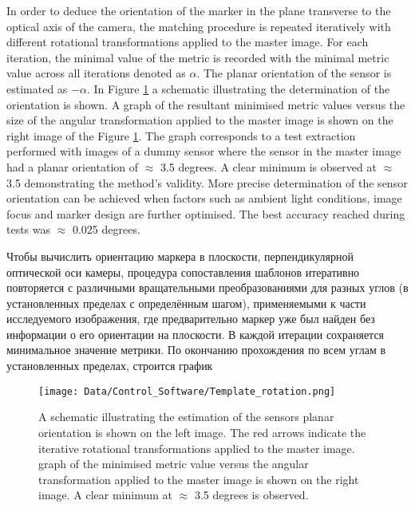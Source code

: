 In order to deduce the orientation of the marker in the plane transverse to the optical axis of the camera, the matching procedure is repeated iteratively with different rotational transformations applied to the master image. For each iteration, the minimal value of the metric is recorded with the minimal metric value across all iterations denoted as $\alpha$. The planar orientation of the sensor is estimated as $-\alpha$. In Figure \ref{fig:template_rotation} a schematic illustrating the determination of the orientation is shown. A graph of the resultant minimised metric values versus the size of the angular transformation applied to the master image is shown on the right image of the Figure \ref{fig:template_rotation}. The graph corresponds to a test extraction performed with images of a dummy sensor where the sensor in the master image had a planar orientation of $\approx$ 3.5 degrees. A clear minimum is observed at $\approx$ 3.5 demonstrating the method's validity. More precise determination of the sensor orientation can be achieved when factors such as ambient light conditions, image focus and marker design are further optimised. The best accuracy reached during tests was $\approx$ 0.025 degrees.

Чтобы вычислить ориентацию маркера в плоскости, перпендикулярной оптической оси камеры, процедура сопоставления шаблонов итеративно повторяется с различными вращательными преобразованиями для разных углов (в установленных пределах с определённым шагом), применяемыми к части исследуемого изображения, где предварительно маркер уже был найден без информации о его ориентации на плоскости. В каждой итерации сохраняется минимальное значение метрики. По окончанию прохождения по всем углам в установленных пределах, строится график 

\begin{figure}[ht]\centering
\texttt{[image: Data/Control\_Software/Template\_rotation.png]}
\caption{A schematic illustrating the estimation of the sensors planar orientation is shown on the left image. The red arrows indicate the iterative rotational transformations applied to the master image. graph of the minimised metric value versus the angular transformation applied to the master image is shown on the right image. A clear minimum at $\approx$ 3.5 degrees is observed.}
\label{fig:template_rotation}
\end{figure}


